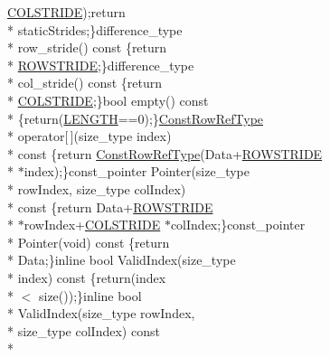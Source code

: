 \begin{DoxyCompactItemize}
\hyperlink{classvct_fixed_size_const_matrix_base_a0aa9b864b8810dd6a50640c965564bd0aee4513ad3dee685fdda1bc2c264be993}{C\-O\-L\-S\-T\-R\-I\-D\-E});return \\*
static\-Strides;\}difference\-\_\-type \\*
row\-\_\-stride() const \{return \\*
\hyperlink{classvct_fixed_size_const_matrix_base_a0aa9b864b8810dd6a50640c965564bd0a1249f054e777d0972eee94e9e33c3f4f}{R\-O\-W\-S\-T\-R\-I\-D\-E};\}difference\-\_\-type \\*
col\-\_\-stride() const \{return \\*
\hyperlink{classvct_fixed_size_const_matrix_base_a0aa9b864b8810dd6a50640c965564bd0aee4513ad3dee685fdda1bc2c264be993}{C\-O\-L\-S\-T\-R\-I\-D\-E};\}bool empty() const \\*
\{return(\hyperlink{classvct_fixed_size_const_matrix_base_a05da4a844e1880e31d3052abb9a8063ba3a9b8b3d119455a4b5f4a6553a707f92}{L\-E\-N\-G\-T\-H}==0);\}\hyperlink{classvct_fixed_size_const_matrix_base_a74355396eec7437755398c2810e0df41}{Const\-Row\-Ref\-Type} \\*
operator\mbox{[}$\,$\mbox{]}(size\-\_\-type index) \\*
const \{return \hyperlink{classvct_fixed_size_const_matrix_base_a74355396eec7437755398c2810e0df41}{Const\-Row\-Ref\-Type}(Data+\hyperlink{classvct_fixed_size_const_matrix_base_a0aa9b864b8810dd6a50640c965564bd0a1249f054e777d0972eee94e9e33c3f4f}{R\-O\-W\-S\-T\-R\-I\-D\-E} \\*
$\ast$index);\}const\-\_\-pointer Pointer(size\-\_\-type \\*
row\-Index, size\-\_\-type col\-Index) \\*
const \{return Data+\hyperlink{classvct_fixed_size_const_matrix_base_a0aa9b864b8810dd6a50640c965564bd0a1249f054e777d0972eee94e9e33c3f4f}{R\-O\-W\-S\-T\-R\-I\-D\-E} \\*
$\ast$row\-Index+\hyperlink{classvct_fixed_size_const_matrix_base_a0aa9b864b8810dd6a50640c965564bd0aee4513ad3dee685fdda1bc2c264be993}{C\-O\-L\-S\-T\-R\-I\-D\-E} $\ast$col\-Index;\}const\-\_\-pointer \\*
Pointer(void) const \{return \\*
Data;\}inline bool Valid\-Index(size\-\_\-type \\*
index) const \{return(index\\*
$<$ size());\}inline bool \\*
Valid\-Index(size\-\_\-type row\-Index, \\*
size\-\_\-type col\-Index) const \\*

\end{DoxyCompactItemize}
